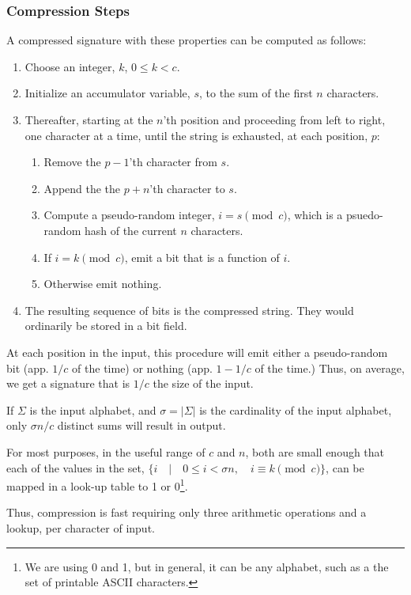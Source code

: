 \documentclass[html]{article}    %
\begin{document}
\subsubsection{Compression Steps}
A compressed signature with these properties can be computed as follows:
\begin{enumerate}
  	\item {
  		Choose an integer, $k$, $0\leq k < c$.
	}
	\item{Initialize an accumulator variable, $s$, to the sum of the first $n$
	characters.}
	\item {
		Thereafter, starting at the $n$'th position and proceeding from 
		left to right, one character at a time, until the string is exhausted, 
		at each position, $p$:
		\begin{enumerate}
			\item { Remove the $p-1$'th character from $s$. }
			\item { Append the the $p+n$'th character to $s$.}
			\item{  Compute a pseudo-random integer, $i=s \pmod c$, which is 
				a psuedo-random hash of the current $n$ characters.} 
			\item { If $i=k \pmod c$, emit a bit that is a function of $i$. }
			\item { Otherwise emit nothing.}
		\end{enumerate}
	}	
	\item {The resulting sequence of bits is the compressed string. They would
	ordinarily be stored in a bit field.}
\end{enumerate}

At each position in the input, this procedure will emit either a
pseudo-random bit (app. $1/c$ of the time) or nothing (app. $1-1/c$ of the
time.) Thus, on average, we get a signature that is $1/c$ the size of the input.

If $\Sigma$ is the input alphabet, and $\sigma = |\Sigma|$ is the 
cardinality of the input alphabet, only $\sigma n/c$ distinct sums
will result in output. 

For most purposes, in the useful range of $c$ and $n$, both are small enough
that each of the values in the set, 
$\lbrace i \quad |\quad 0 \leq i < \sigma n, \quad i \equiv k\pmod c \rbrace$, 
can be mapped in a look-up table to 1 or 0\footnote{We are using 0 and 1, but
in general, it can be any alphabet, such as a the set of printable ASCII
characters.}.

Thus, compression is fast requiring only three
arithmetic operations and a lookup, per character of input.
	
\end{document}
